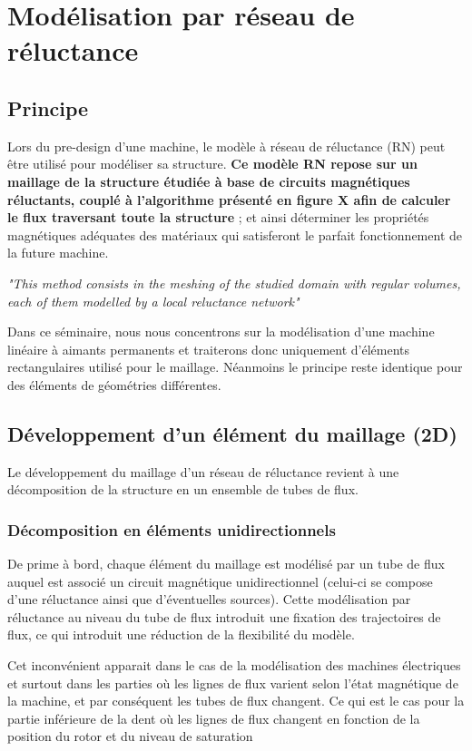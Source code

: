 \section{Modélisation par réseau de réluctance}
\subsection{Principe}
Lors du pre-design d'une machine, le modèle à réseau de réluctance (RN) peut être utilisé pour modéliser sa structure. \textbf{Ce modèle RN repose sur un maillage de la structure étudiée à base de circuits magnétiques réluctants, couplé à l'algorithme présenté en figure X afin de calculer le flux traversant toute la structure} ; et ainsi déterminer les propriétés magnétiques adéquates des matériaux qui satisferont le parfait fonctionnement de la future machine.

\begin{center}
 \textit{"This method consists in the meshing of the studied domain with regular volumes, each of
them modelled by a local reluctance network"} 
\end{center}

Dans ce séminaire, nous nous concentrons sur la modélisation d'une machine linéaire à aimants permanents et traiterons donc uniquement d'éléments rectangulaires utilisé pour le maillage. Néanmoins le principe reste identique pour des éléments de géométries différentes.

\subsection{Développement d'un élément du maillage (2D)}

Le développement du maillage d’un réseau de réluctance revient à une décomposition de la structure en
un ensemble de tubes de flux.

\subsubsection{Décomposition en éléments unidirectionnels}
De prime à bord, chaque élément du maillage est modélisé par un tube de flux auquel est associé un circuit magnétique unidirectionnel (celui-ci se compose d'une réluctance ainsi que d'éventuelles sources). Cette modélisation par réluctance au niveau du tube de flux introduit une fixation des trajectoires de flux, ce qui introduit une réduction de la flexibilité du modèle.

Cet inconvénient apparait dans le cas de la modélisation des machines électriques et surtout
dans les parties où les lignes de flux varient selon l’état magnétique de la machine, et par
conséquent les tubes de flux changent. Ce qui est le cas pour la partie inférieure de la dent où
les lignes de flux changent en fonction de la position du rotor et du niveau de saturation


